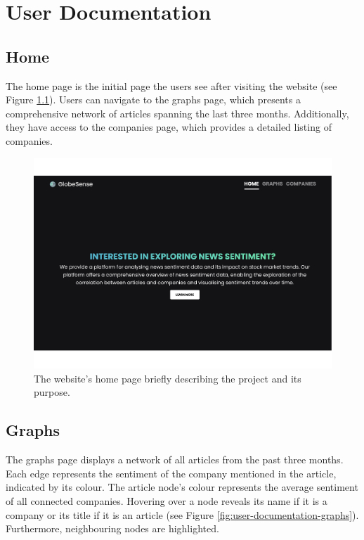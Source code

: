 \chapter{User Documentation}
\label{chap:user-documentation}

\section{Home}
\label{sec:user-documentation-home}
The home page is the initial page the users see after visiting the website (see Figure \ref{fig:user-documentation-home}). Users can navigate to the graphs page, which presents a comprehensive network of articles spanning the last three months. Additionally, they have access to the companies page, which provides a detailed listing of companies.

\begin{figure}[ht]
  \centering
  \includegraphics[width=\textwidth]{img/user/home-a.pdf}
  \caption{The website's home page briefly describing the project and its purpose.}
  \label{fig:user-documentation-home}
\end{figure}

\section{Graphs}
\label{sec:user-documentation-graphs}
The graphs page displays a network of all articles from the past three months. Each edge represents the sentiment of the company mentioned in the article, indicated by its colour. The article node's colour represents the average sentiment of all connected companies. Hovering over a node reveals its name if it is a company or its title if it is an article (see Figure \ref{fig:user-documentation-graphs}). Furthermore, neighbouring nodes are highlighted.

